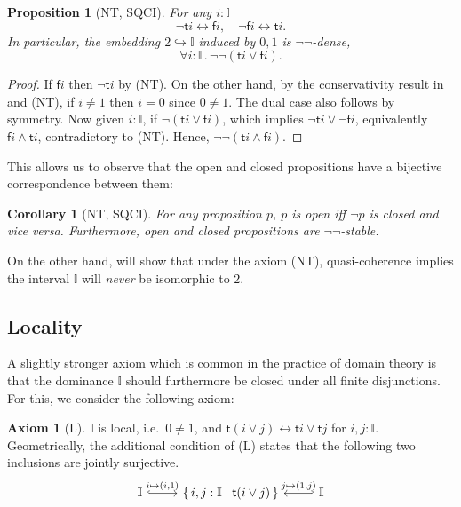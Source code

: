 \documentclass[a4paper,12pt]{amsart}
\newtheorem{corollary}[theorem]{Corollary}
\newtheorem{proposition}[theorem]{Proposition}
\theoremstyle{definition}
\newtheorem*{axiom}{Axiom}
\newcommand{\mbb}[1]{\mathbb{#1}}
\newcommand{\I}{\mbb I}
\newcommand{\ms}[1]{\mathsf{#1}}
\newcommand{\scomp}[2]{\{\,#1\mid#2\,\}}
\newcommand{\hook}{\hookrightarrow}
\newcommand{\dneg}{\neg\neg}
\newcommand{\fa}[2]{\forall #1\!\colon\!\!#2\mathpunct{.}}
\newcommand{\eq}{\leftrightarrow}
\begin{document}
\begin{proposition}[NT, SQCI]\label{prop:filed}
  For any $i : \I$ 
  \[ \neg \ms ti \eq \ms fi, \quad \neg\ms fi \eq \ms ti. \]
  In particular, the embedding $2 \hook \I$ induced by $0,1$ is $\neg\neg$-dense,
  \[ \fa i\I \dneg(\ms ti \vee \ms fi). \]
\end{proposition}
\begin{proof}
  If $\ms fi$ then $\neg\ms ti$ by (NT). On the other hand, by the conservativity result in  and (NT), if $i \neq 1$ then $i = 0$ since $0 \neq 1$. The dual case also follows by symmetry. Now given $i :\I$, if $\neg(\ms ti \vee \ms fi)$, which implies $\neg\ms ti \vee \neg\ms fi$, equivalently $\ms fi \wedge \ms ti$, contradictory to (NT). Hence, $\neg\neg(\ms ti \wedge \ms fi)$.
\end{proof}

This allows us to observe that the open and closed propositions have a bijective correspondence between them:

\begin{corollary}[NT, SQCI]\label{cor:opendnegclose}
  For any proposition $p$, $p$ is open iff $\neg p$ is closed and vice versa. Furthermore, open and closed propositions are $\dneg$-stable.
\end{corollary}

On the other hand,  will show that under the axiom (NT), quasi-coherence implies the interval $\I$ will \emph{never} be isomorphic to $2$. 

\subsection{Locality}

A slightly stronger axiom which is common in the practice of domain theory is that the dominance $\I$ should furthermore be closed under all finite disjunctions. For this, we consider the following axiom:

\begin{axiom}[L]\label{ax:L}
  $\I$ is local, i.e.\ $0 \neq 1$, and $\ms t(i\vee j) \eq \ms ti \vee \ms tj$ for $i,j : \I$. Geometrically, the additional condition of (L) states that the following two inclusions are jointly surjective. 
  \[ 
  \begin{tikzcd}
    \I \ar[r, hook, "{i \mapsto (i,1)}"] & \scomp{i,j : \I}{\ms t(i\vee j)} & \I \ar[l, hook', "{j \mapsto (1,j)}"']
  \end{tikzcd}
  \]
\end{axiom}
\end{document}
